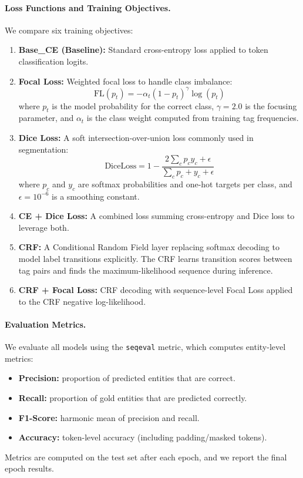 \paragraph{Loss Functions and Training Objectives.}
We compare six training objectives:

\begin{enumerate}
  \item \textbf{Base\_CE (Baseline):} Standard cross-entropy loss applied to token classification logits.
  
  \item \textbf{Focal Loss:} Weighted focal loss to handle class imbalance:
  \begin{equation}
    \text{FL}(p_t) = -\alpha_t (1 - p_t)^\gamma \log(p_t)
  \end{equation}
  where $p_t$ is the model probability for the correct class, $\gamma = 2.0$ is the focusing parameter, and $\alpha_t$ is the class weight computed from training tag frequencies.
  
  \item \textbf{Dice Loss:} A soft intersection-over-union loss commonly used in segmentation:
  \begin{equation}
    \text{DiceLoss} = 1 - \frac{2 \sum_c p_c y_c + \epsilon}{\sum_c p_c + y_c + \epsilon}
  \end{equation}
  where $p_c$ and $y_c$ are softmax probabilities and one-hot targets per class, and $\epsilon = 10^{-6}$ is a smoothing constant.
  
  \item \textbf{CE + Dice Loss:} A combined loss summing cross-entropy and Dice loss to leverage both.
  
  \item \textbf{CRF:} A Conditional Random Field layer replacing softmax decoding to model label transitions explicitly. The CRF learns transition scores between tag pairs and finds the maximum-likelihood sequence during inference.
  
  \item \textbf{CRF + Focal Loss:} CRF decoding with sequence-level Focal Loss applied to the CRF negative log-likelihood.
\end{enumerate}

\paragraph{Evaluation Metrics.}
We evaluate all models using the \texttt{seqeval} metric, which computes entity-level metrics:
\begin{itemize}
  \item \textbf{Precision:} proportion of predicted entities that are correct.
  \item \textbf{Recall:} proportion of gold entities that are predicted correctly.
  \item \textbf{F1-Score:} harmonic mean of precision and recall.
  \item \textbf{Accuracy:} token-level accuracy (including padding/masked tokens).
\end{itemize}
Metrics are computed on the test set after each epoch, and we report the final epoch results.


